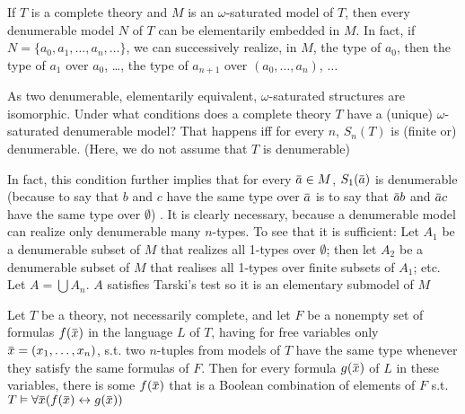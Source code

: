 \documentclass[11pt]{article}
\begin{document}
If \(T\) is a complete theory and \(M\) is an \(\omega\)-saturated model of \(T\), then every denumerable
model \(N\) of \(T\) can be elementarily embedded in \(M\). In fact, if \(N=\{a_0,a_1,\dots,a_n,\dots\}\),
we can successively realize, in \(M\), the type of \(a_0\), then the type of \(a_1\)
over \(a_0\), \dots{}, the type of \(a_{n+1}\) over \((a_0,\dots,a_n)\), \(\dots\)

As two denumerable, elementarily equivalent, \(\omega\)-saturated structures are isomorphic. Under what
conditions does a complete theory \(T\) have a (unique) \(\omega\)-saturated denumerable model? That
happens iff for every \(n\), \(S_n(T)\) is (finite or) denumerable. (Here, we do not assume that
\(T\) is denumerable)

In fact, this condition further implies that for every \(\bara\in M\), \(S_1(\bara)\) is
denumerable (because to say that \(b\) and \(c\) have the same type over \(\bara\) is to say
that \(\bara b\) and \(\bara c\) have the same type over \(\emptyset\)) . It is clearly necessary,
because a denumerable model can realize only denumerable many \(n\)-types. To see that it is
sufficient: Let \(A_1\) be a denumerable subset of \(M\) that realizes all 1-types over \(\emptyset\);
then let \(A_2\) be a denumerable subset of \(M\) that realises all 1-types over finite subsets
of \(A_1\); etc. Let \(A=\bigcup A_n\). \(A\) satisfies Tarski's test so it is an elementary submodel
of \(M\)

\begin{theorem}[]
\label{thm5.3}
Let \(T\) be a theory, not necessarily complete, and let \(F\) be a nonempty set of
formulas \(f(\barx)\) in the language \(L\) of \(T\), having for free variables
only \(\barx=(x_1,\dots,x_n)\), s.t. two \(n\)-tuples from models of \(T\) have the same type
whenever they satisfy the same formulas of \(F\). Then for every formula \(g(\barx)\) of \(L\)
in these variables, there is some \(f(\barx)\) that is a Boolean combination of elements
of \(F\) s.t. \(T\vDash\forall\barx(f(\barx)\leftrightarrow g(\barx))\)
\end{theorem}
\end{document}
